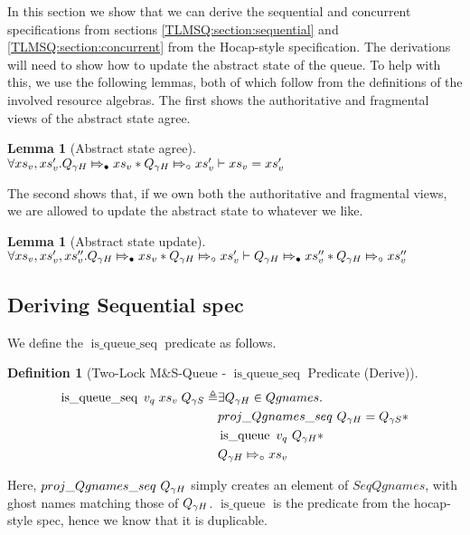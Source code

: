 \documentclass[twoside,11pt,openright]{report}
\newtheorem{lemma}[theorem]{Lemma}
\newtheorem{definition}{Definition}[section]
\newcommand{\isqueue}{\operatorname{is\_queue}}
\newcommand{\isqueueseq}{\operatorname{is\_queue\_seq}}
\newcommand{\abstractstatefullfrag}[2]{#1 \Mapsto_{\circ} #2}
\newcommand{\abstractstateauth}[2]{#1 \Mapsto_{\bullet} #2}
\begin{document}
In this section we show that we can derive the sequential and concurrent specifications from sections \ref{TLMSQ:section:sequential} and \ref{TLMSQ:section:concurrent} from the Hocap-style specification. The derivations will need to show how to update the abstract state of the queue. To help with this, we use the following lemmas, both of which follow from the definitions of the involved resource algebras. The first shows the authoritative and fragmental views of the abstract state agree.
\begin{lemma}[Abstract state agree]\label{TLMSQ:hocap:abst:agree}
  $\All xs_v, xs_v' .\\
  \abstractstateauth{Q_{\gname H}}{xs_v} \star \abstractstatefullfrag{Q_{\gname H}}{xs_v'} \proves xs_v = xs_v'$
\end{lemma}
The second shows that, if we own both the authoritative and fragmental views, we are allowed to update the abstract state to whatever we like.
\begin{lemma}[Abstract state update]\label{TLMSQ:hocap:abst:update}
  $\All xs_v, xs_v', xs_v'' .\\
  \abstractstateauth{Q_{\gname H}}{xs_v} \star \abstractstatefullfrag{Q_{\gname H}}{xs_v'} \proves \abstractstateauth{Q_{\gname H}}{xs_v''} \star \abstractstatefullfrag{Q_{\gname H}}{xs_v''}$
\end{lemma}

\subsection{Deriving Sequential spec}
We define the $\isqueueseq$ predicate as follows.
\begin{definition}[Two-Lock M\&S-Queue - $\isqueueseq$ Predicate (Derive)]\label{TLMSQ:spec:isqueueseq_derive}
\begin{align*}
  \isqueueseq \; v_q \; xs_v \; Q_{\gname S} \eqdef
    &\Exists Q_{\gname H} \in Qgnames .\\
    &proj\_Qgnames\_seq \ Q_{\gname H} = Q_{\gname S} \star\\
    &\isqueue \ v_q \ Q_{\gname H} \star\\
    &\abstractstatefullfrag{Q_{\gname H}}{xs_v}
\end{align*}
\end{definition}

Here, $proj\_Qgnames\_seq \ Q_{\gamma H}$ simply creates an element of $SeqQgnames$, with ghost names matching those of $Q_{\gamma H}$.
$\isqueue$ is the predicate from the hocap-style spec, hence we know that it is duplicable.
\end{document}
